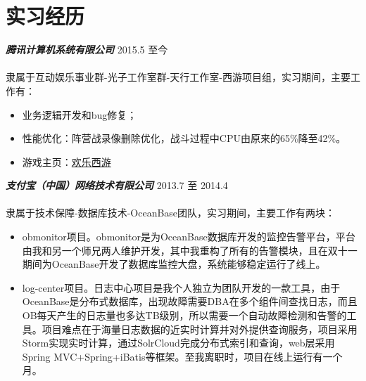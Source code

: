 \documentclass[10pt]{article} %
\begin{document}
\color{text1} %




\begin{minipage}[t]{0.6\textwidth} %
\vspace{0pt} %



\section{实习经历}

{\bf \large \textit{腾讯计算机系统有限公司}} \hfill  \hfill {2015.5 至今\\}\\
{隶属于互动娱乐事业群-光子工作室群-天行工作室-西游项目组，实习期间，主要工作有：}
\begin{itemize} \itemsep -1pt 
\item 业务逻辑开发和bug修复；
\item 性能优化：阵营战录像删除优化，战斗过程中CPU由原来的65\%降至42\%。
\item 游戏主页：\href{http://hlxy.qq.com/}{欢乐西游}
\end{itemize}

{\bf \large \textit{支付宝（中国）网络技术有限公司}} \hfill  \hfill {2013.7 至 2014.4\\}\\
{隶属于技术保障-数据库技术-OceanBase团队，实习期间，主要工作有两块：}
\begin{itemize} \itemsep -1pt 
\item obmonitor项目。obmonitor是为OceanBase数据库开发的监控告警平台，平台由我和另一个师兄两人维护开发，其中我重构了所有的告警模块，且在双十一期间为OceanBase开发了数据库监控大盘，系统能够稳定运行了线上。
\item log-center项目。日志中心项目是我个人独立为团队开发的一款工具，由于OceanBase是分布式数据库，出现故障需要DBA在多个组件间查找日志，而且OB每天产生的日志量也多达TB级别，所以需要一个自动故障检测和告警的工具。项目难点在于海量日志数据的近实时计算并对外提供查询服务，项目采用Storm实现实时计算，通过SolrCloud完成分布式索引和查询，web层采用Spring MVC+Spring+iBatis等框架。至我离职时，项目在线上运行有一个月。
\end{itemize}


\end{minipage}
\end{document}
